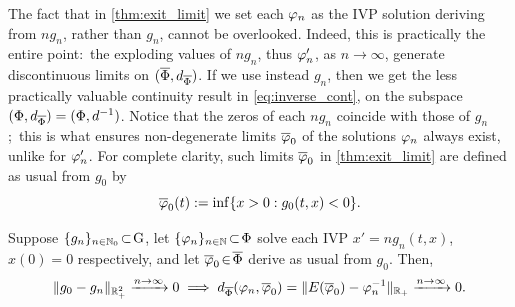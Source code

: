The fact that in \autoref{thm:exit_limit} we set each $\varphi_n$ as the IVP solution deriving from $n g_n$, rather than $g_n$, cannot be overlooked. Indeed, this is practically the entire point:~the exploding values of $n g_n$, thus $\varphi'_n$, as $n\to\infty$, generate discontinuous limits on $(\overline{\Phi},d_{\overline{\Phi}})$. If we use instead $g_n$, then we get the less practically valuable continuity result in \autoref{eq:inverse_cont}, on the subspace $(\Phi,d_{\overline{\Phi}})=(\Phi,d^{-1})$. Notice that the zeros of each $n g_n$ coincide with those of $g_n$;~this is what ensures non-degenerate limits $\overline{\varphi}_0$ of the solutions $\varphi_n$ always exist, unlike for $\varphi'_n$. For complete clarity, such limits $\overline{\varphi}_0$ in \autoref{thm:exit_limit} are defined as usual from $g_0$ by
\begin{equation}
    \overline{\varphi}_0(t):=\inf\{x>0:g_0(t,x)<0\}.
\end{equation}
\begin{theorem}\label{thm:exit_limit}
    $\!$Suppose $\{g_n\}_{n\in\mathbb{N}_0}\!\subset\!\mathrm{G}$, let $\{\varphi_n\}_{n\in\mathbb{N}}\!\subset\!\Phi$ solve each IVP $x'\!=\!ng_n(t,x)$, $x(0)\!=\!0$ respectively, and let $\overline{\varphi}_0\!\in\!\overline{\Phi}$ derive as usual from $g_0$.$\!$ Then,
    \begin{equation}\label{eq:converge_metric}
        \Vert g_0 - g_n \Vert_{\mathbb{R}_+^2}\xrightarrow{n\to\infty}0 \implies d_{\overline{\Phi}}(\varphi_n,\overline{\varphi}_0) = \Vert E(\overline{\varphi}_0) - \varphi^{-1}_n \Vert_{\mathbb{R}_+} \xrightarrow{n\to\infty} 0.
    \end{equation}
\end{theorem}
